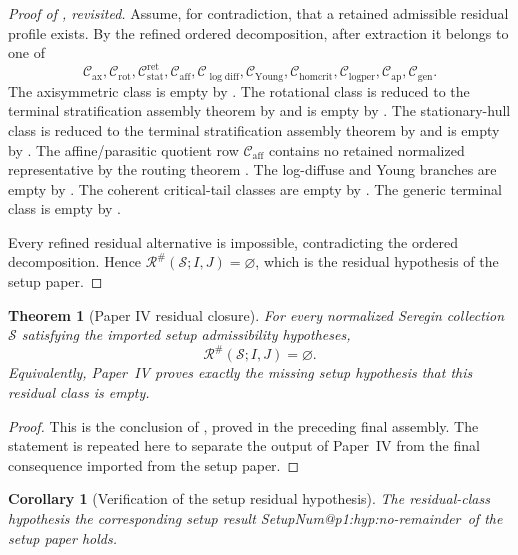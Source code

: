 \documentclass[11pt]{amsart}
\makeatletter
\numberwithin{equation}{section}
\theoremstyle{plain}
\newtheorem{theorem}{Theorem}[section]
\newtheorem{corollary}[corollary]{Corollary}
\theoremstyle{definition}
\theoremstyle{remark}
\newcommand{\calS}{\mathcal S}
\newcommand{\calR}{\mathcal R}
\newcommand{\Cax}{\mathcal C_{\mathrm{ax}}}
\newcommand{\Crot}{\mathcal C_{\mathrm{rot}}}
\newcommand{\Cstat}{\mathcal C_{\mathrm{stat}}^{\mathrm{ret}}}
\newcommand{\Caff}{\mathcal C_{\mathrm{aff}}}
\newcommand{\Cgen}{\mathcal C_{\mathrm{gen}}}
\newcommand{\Chomcrit}{\mathcal C_{\mathrm{homcrit}}}
\newcommand{\Clogper}{\mathcal C_{\mathrm{logper}}}
\newcommand{\Capcrit}{\mathcal C_{\mathrm{ap}}}
\newcommand{\Cyoung}{\mathcal C_{\mathrm{Young}}}
\newcommand{\Clogdiff}{\mathcal C_{\log\mathrm{diff}}}
\newcommand{\SetupLabel}[1]{%
   \@ifundefined{SetupNum@#1}%
      {\textup{the corresponding setup result}}%
      {\csname SetupNum@#1\endcsname\ of the setup paper}%
}
\makeatother
\begin{document}
\begin{proof}[Proof of , revisited]
Assume, for contradiction, that a retained admissible residual profile exists.
By the refined ordered decomposition, after extraction it belongs to one of
\[
   \Cax,\Crot,\Cstat,\Caff,\Clogdiff,\Cyoung,
   \Chomcrit,\Clogper,\Capcrit,\Cgen .
\]
The axisymmetric class is empty by .  The rotational
class is reduced to the terminal stratification assembly theorem by  and
is empty by .  The stationary-hull class is reduced to
the terminal stratification assembly theorem by
 and is
empty by .  The affine/parasitic quotient row
\(\Caff\) contains no retained normalized representative by the routing theorem
.  The
log-diffuse and Young branches are empty by
.  The
coherent critical-tail classes are empty by
.  The generic terminal class
is empty by .

Every refined residual alternative is impossible, contradicting the ordered
decomposition.  Hence
\(\calR^\#(\calS;I,J)=\varnothing\), which is the residual hypothesis of the
setup paper.
\end{proof}

\begin{theorem}[Paper IV residual closure]
\label{thm:paperIV-residual-closure}
For every normalized Seregin collection \(\calS\) satisfying the imported setup
admissibility hypotheses,
\[
   \calR^\#(\calS;I,J)=\varnothing .
\]
Equivalently, Paper~IV proves exactly the missing setup hypothesis
that this residual class is empty.
\end{theorem}

\begin{proof}
This is the conclusion of , proved in the
preceding final assembly.  The statement is repeated here to separate the output
of Paper~IV from the final consequence imported from the setup paper.
\end{proof}

\begin{corollary}[Verification of the setup residual hypothesis]
\label{cor:setup-residual-hypothesis-proof}
The residual-class hypothesis
\SetupLabel{p1:hyp:no-remainder} holds.
\end{corollary}
\end{document}
